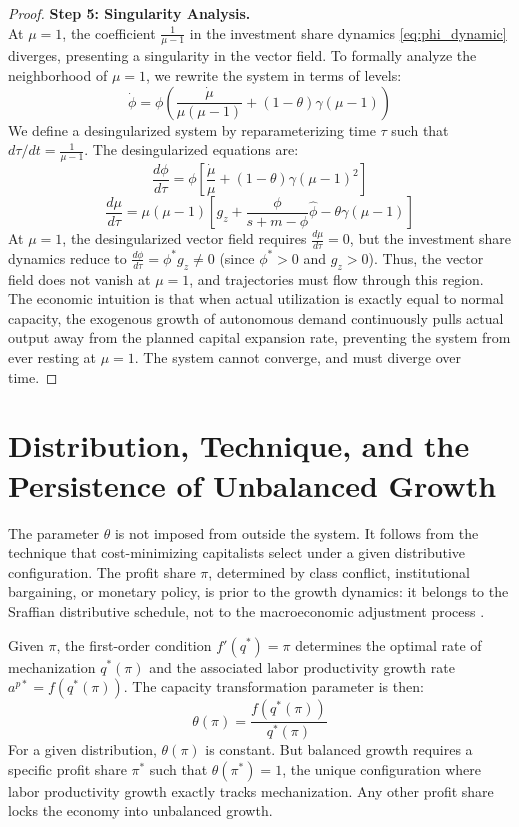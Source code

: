 \documentclass[12pt, a4paper]{article}
\theoremstyle{definition}
\theoremstyle{remark}
\begin{document}
\begin{proof}
\textbf{Step 5: Singularity Analysis.} \\
At $\mu = 1$, the coefficient $\frac{1}{\mu - 1}$ in the investment share dynamics \eqref{eq:phi_dynamic} diverges, presenting a singularity in the vector field. To formally analyze the neighborhood of $\mu = 1$, we rewrite the system in terms of levels:
\[
\dot{\phi} = \phi \left( \frac{\dot{\mu}}{\mu(\mu - 1)} + (1 - \theta)\gamma(\mu - 1) \right)
\]
We define a desingularized system by reparameterizing time $\tau$ such that $d\tau/dt = \frac{1}{\mu - 1}$. The desingularized equations are:
\[
\frac{d\phi}{d\tau} = \phi \left[ \frac{\dot{\mu}}{\mu} + (1 - \theta)\gamma(\mu - 1)^2 \right]
\]
\[
\frac{d\mu}{d\tau} = \mu(\mu - 1) \left[ g_z + \frac{\phi}{s + m - \phi}\hat{\phi} - \theta\gamma(\mu - 1) \right]
\]
At $\mu = 1$, the desingularized vector field requires $\frac{d\mu}{d\tau} = 0$, but the investment share dynamics reduce to $\frac{d\phi}{d\tau} = \phi^* g_z \neq 0$ (since $\phi^* > 0$ and $g_z > 0$). Thus, the vector field does not vanish at $\mu = 1$, and trajectories must flow through this region. The economic intuition is that when actual utilization is exactly equal to normal capacity, the exogenous growth of autonomous demand continuously pulls actual output away from the planned capital expansion rate, preventing the system from ever resting at $\mu=1$. The system cannot converge, and must diverge over time.
\end{proof}

\section{Distribution, Technique, and the Persistence of Unbalanced Growth}

The parameter $\theta$ is not imposed from outside the system. It follows from the technique that cost-minimizing capitalists select under a given distributive configuration. The profit share $\pi$, determined by class conflict, institutional bargaining, or monetary policy, is prior to the growth dynamics: it belongs to the Sraffian distributive schedule, not to the macroeconomic adjustment process \citep{kurz1995}.

Given $\pi$, the first-order condition $f'(q^*) = \pi$ determines the optimal rate of mechanization $q^*(\pi)$ and the associated labor productivity growth rate $a^{p*} = f(q^*(\pi))$. The capacity transformation parameter is then:
\begin{equation} \label{eq:theta_endogenous}
    \theta(\pi) = \frac{f(q^*(\pi))}{q^*(\pi)}
\end{equation}
For a given distribution, $\theta(\pi)$ is constant. But balanced growth requires a specific profit share $\pi^*$ such that $\theta(\pi^*) = 1$, the unique configuration where labor productivity growth exactly tracks mechanization. Any other profit share locks the economy into unbalanced growth.
\end{document}
